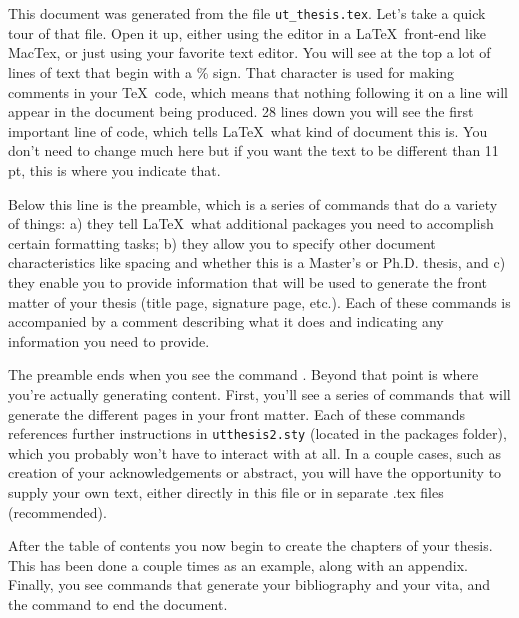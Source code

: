 \section{}

This document was generated from the file {\tt ut\_thesis.tex}. 
Let's take a quick tour of that file.
Open it up, either using the editor in
a \LaTeX ~front-end like MacTex, or just using your
favorite text editor. You will see at the top a lot of lines of text that begin
with a \% sign. That character is used for making comments in your \TeX ~code,
which means that nothing following it on a line will appear in the document
being produced. 28 lines down you will see the first important line of code,
which tells \LaTeX ~what kind of document this is. You don't need to change much
here but if you want the text to be different than 11 pt, this is where you
indicate that.

Below this line is the preamble, which is a series of commands that do a
variety of things: a) they tell \LaTeX ~what additional packages you need to
accomplish certain formatting tasks; b) they allow you to specify other
document characteristics like spacing and whether this is a Master's or 
Ph.D. thesis, and c) they enable you to provide information that will be used
to generate the front matter of your thesis (title page, signature page, etc.).
Each of these commands is accompanied by a comment describing what it does and
indicating any information you need to provide.

The preamble ends when you see the command  \verb++. Beyond
that point is where you're actually generating content. First, you'll see
a series of commands that will generate the different pages in your front
matter. Each of these commands references further instructions in 
{\tt utthesis2.sty} (located in the packages folder), which you probably won't 
have to interact with at all. In a couple cases, such as creation of your
acknowledgements or abstract, you will have the opportunity to supply your own
text, either directly in this file or in separate .tex files (recommended).

After the table of contents you now begin to create the chapters of your thesis.
This has been done a couple times as an example, along with an appendix.
Finally, you see commands that generate your bibliography and your vita, and
the command to end the document.

\section{}
\label{sec:content}

